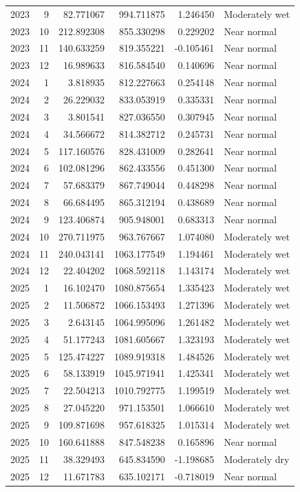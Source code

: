 \begin{tabular}{rrrrrl}
2023 & 9 & 82.771067 & 994.711875 & 1.246450 & Moderately wet \\
2023 & 10 & 212.892308 & 855.330298 & 0.229202 & Near normal \\
2023 & 11 & 140.633259 & 819.355221 & -0.105461 & Near normal \\
2023 & 12 & 16.989633 & 816.584540 & 0.140696 & Near normal \\
2024 & 1 & 3.818935 & 812.227663 & 0.254148 & Near normal \\
2024 & 2 & 26.229032 & 833.053919 & 0.335331 & Near normal \\
2024 & 3 & 3.801541 & 827.036550 & 0.307945 & Near normal \\
2024 & 4 & 34.566672 & 814.382712 & 0.245731 & Near normal \\
2024 & 5 & 117.160576 & 828.431009 & 0.282641 & Near normal \\
2024 & 6 & 102.081296 & 862.433556 & 0.451300 & Near normal \\
2024 & 7 & 57.683379 & 867.749044 & 0.448298 & Near normal \\
2024 & 8 & 66.684495 & 865.312194 & 0.438689 & Near normal \\
2024 & 9 & 123.406874 & 905.948001 & 0.683313 & Near normal \\
2024 & 10 & 270.711975 & 963.767667 & 1.074080 & Moderately wet \\
2024 & 11 & 240.043141 & 1063.177549 & 1.194461 & Moderately wet \\
2024 & 12 & 22.404202 & 1068.592118 & 1.143174 & Moderately wet \\
2025 & 1 & 16.102470 & 1080.875654 & 1.335423 & Moderately wet \\
2025 & 2 & 11.506872 & 1066.153493 & 1.271396 & Moderately wet \\
2025 & 3 & 2.643145 & 1064.995096 & 1.261482 & Moderately wet \\
2025 & 4 & 51.177243 & 1081.605667 & 1.323193 & Moderately wet \\
2025 & 5 & 125.474227 & 1089.919318 & 1.484526 & Moderately wet \\
2025 & 6 & 58.133919 & 1045.971941 & 1.425341 & Moderately wet \\
2025 & 7 & 22.504213 & 1010.792775 & 1.199519 & Moderately wet \\
2025 & 8 & 27.045220 & 971.153501 & 1.066610 & Moderately wet \\
2025 & 9 & 109.871698 & 957.618325 & 1.015314 & Moderately wet \\
2025 & 10 & 160.641888 & 847.548238 & 0.165896 & Near normal \\
2025 & 11 & 38.329493 & 645.834590 & -1.198685 & Moderately dry \\
2025 & 12 & 11.671783 & 635.102171 & -0.718019 & Near normal \\
\bottomrule
\end{tabular}
